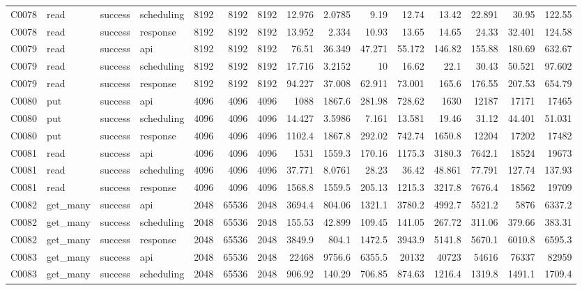 \begin{landscape}
\begin{longtable}{llllrrrrrrrrrrr}
C0078 & read & success & scheduling & 8192 & 8192 & 8192 & 12.976 & 2.0785 & 9.19 & 12.74 & 13.42 & 22.891 & 30.95 & 122.55\\
C0078 & read & success & response & 8192 & 8192 & 8192 & 13.952 & 2.334 & 10.93 & 13.65 & 14.65 & 24.33 & 32.401 & 124.58\\
C0079 & read & success & api & 8192 & 8192 & 8192 & 76.51 & 36.349 & 47.271 & 55.172 & 146.82 & 155.88 & 180.69 & 632.67\\
C0079 & read & success & scheduling & 8192 & 8192 & 8192 & 17.716 & 3.2152 & 10 & 16.62 & 22.1 & 30.43 & 50.521 & 97.602\\
C0079 & read & success & response & 8192 & 8192 & 8192 & 94.227 & 37.008 & 62.911 & 73.001 & 165.6 & 176.55 & 207.53 & 654.79\\
C0080 & put & success & api & 4096 & 4096 & 4096 & 1088 & 1867.6 & 281.98 & 728.62 & 1630 & 12187 & 17171 & 17465\\
C0080 & put & success & scheduling & 4096 & 4096 & 4096 & 14.427 & 3.5986 & 7.161 & 13.581 & 19.46 & 31.12 & 44.401 & 51.031\\
C0080 & put & success & response & 4096 & 4096 & 4096 & 1102.4 & 1867.8 & 292.02 & 742.74 & 1650.8 & 12204 & 17202 & 17482\\
C0081 & read & success & api & 4096 & 4096 & 4096 & 1531 & 1559.3 & 170.16 & 1175.3 & 3180.3 & 7642.1 & 18524 & 19673\\
C0081 & read & success & scheduling & 4096 & 4096 & 4096 & 37.771 & 8.0761 & 28.23 & 36.42 & 48.861 & 77.791 & 127.74 & 137.93\\
C0081 & read & success & response & 4096 & 4096 & 4096 & 1568.8 & 1559.5 & 205.13 & 1215.3 & 3217.8 & 7676.4 & 18562 & 19709\\
C0082 & get\_\allowbreak{}many & success & api & 2048 & 65536 & 2048 & 3694.4 & 804.06 & 1321.1 & 3780.2 & 4992.7 & 5521.2 & 5876 & 6337.2\\
C0082 & get\_\allowbreak{}many & success & scheduling & 2048 & 65536 & 2048 & 155.53 & 42.899 & 109.45 & 141.05 & 267.72 & 311.06 & 379.66 & 383.31\\
C0082 & get\_\allowbreak{}many & success & response & 2048 & 65536 & 2048 & 3849.9 & 804.1 & 1472.5 & 3943.9 & 5141.8 & 5670.1 & 6010.8 & 6595.3\\
C0083 & get\_\allowbreak{}many & success & api & 2048 & 65536 & 2048 & 22468 & 9756.6 & 6355.5 & 20132 & 40723 & 54616 & 76337 & 82959\\
C0083 & get\_\allowbreak{}many & success & scheduling & 2048 & 65536 & 2048 & 906.92 & 140.29 & 706.85 & 874.63 & 1216.4 & 1319.8 & 1491.1 & 1709.4\\

\end{longtable}
\end{landscape}
